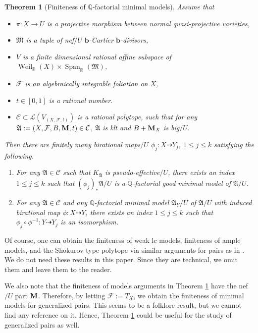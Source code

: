 \documentclass[12pt]{amsart}
\numberwithin{equation}{section}
\newcommand{\bb}{\bm{b}}
\newcommand{\Mm}{{\bf{M}}}
\newcommand{\Span}{\operatorname{Span}}
\newcommand{\Weil}{\operatorname{Weil}}
\newcommand{\Aa}{{\mathfrak{A}}}
\newcommand{\Ff}{\mathcal{F}}
\newcommand{\MM}{{\mathfrak{M}}}
\newtheorem{thmsub}{Theorem}[subsection]
\theoremstyle{definition}
\theoremstyle{definition}
\theoremstyle{definition}
\begin{document}
\begin{thmsub}[Finiteness of $\mathbb Q$-factorial minimal models]\label{thm: finiteness of minimal models intro}
Assume that
\begin{itemize}
    \item $\pi\colon X\rightarrow U$ is a projective morphism between normal quasi-projective varieties,
    \item $\MM$ is a tuple of nef$/U$ $\bb$-Cartier $\bb$-divisors,
    \item $V$ is a finite dimensional rational affine subspace of $\Weil_{\mathbb R}(X)\times\Span_{\mathbb R}(\MM)$,
    \item $\Ff$ is an algebraically integrable foliation on $X$,
    \item $t\in [0,1]$ is a rational number. 
    \item $\mathcal{C}\subset\mathcal{L}(V_{(X,\Ff,t)})$ is a rational polytope, such that for any $\Aa:=(X,\Ff,B,\Mm,t)\in\mathcal{C}$, $\Aa$ is klt and $B+\Mm_X$ is big$/U$.
\end{itemize}
Then there are finitely many birational maps$/U$ $\phi_j: X\dashrightarrow Y_j$, $1\leq j\leq k$ satisfying the following. 
\begin{enumerate}
\item For any $\Aa\in\mathcal{C}$ such that $K_{\Aa}$ is pseudo-effective$/U$, there exists an index $1\leq j\leq k$ such that $(\phi_j)_*\Aa/U$ is a $\mathbb Q$-factorial good minimal model of $\Aa/U$.
\item For any $\Aa\in\mathcal{C}$ and any $\mathbb Q$-factorial minimal model $\Aa_Y/U$ of $\Aa/U$ with induced birational map $\phi\colon X\dashrightarrow Y$, there exists an index $1\leq j\leq k$ such that $\phi_j\circ\phi^{-1}\colon Y\dashrightarrow Y_j$ is an isomorphism.
\end{enumerate}
\end{thmsub}

Of course, one can obtain the finiteness of weak lc models, finiteness of ample models, and the Shokurov-type polytope via similar arguments for pairs as in \cite[Corollary 1.1.5]{BCHM10}. We do not need these results in this paper. Since they are technical, we omit them and leave them to the reader.

We also note that the finiteness of models arguments in Theorem \ref{thm: finiteness of minimal models intro} have the nef$/U$ part $\Mm$. Therefore, by letting $\Ff:=T_X$, we obtain the finiteness of minimal models for generalized pairs. This seems to be a folklore result, but we cannot find any reference on it. Hence, Theorem \ref{thm: finiteness of minimal models intro} could be useful for the study of generalized pairs as well.
\end{document}
